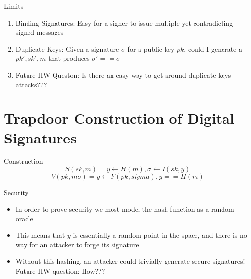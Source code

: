\documentclass[handout]{beamer}
\begin{document}
\begin{frame}{Limits}
    \begin{enumerate}
        \item \pause Binding Signatures: Easy for a signer to issue multiple yet contradicting signed messages
        \item \pause Duplicate Keys: Given a signature \(\sigma\) for a public key \(pk\), could I generate a \(pk', sk', m\) that produces \(\sigma' == \sigma\)
        \item \pause Future HW Queston: Is there an easy way to get around duplicate keys attacks???
    \end{enumerate}
\end{frame}

\section{Trapdoor Construction of Digital Signatures}

\begin{frame}{Construction}
    \pause
    \[S(sk, m) = y \leftarrow H(m), \sigma \leftarrow I(sk, y)\]
    \pause
    \[V(pk, m \sigma) = y \leftarrow F(pk, sigma), y == H(m)\]
\end{frame}

\begin{frame}{Security}
    \begin{itemize}
        \item \pause In order to prove security we most model the hash function as a random oracle
        \item \pause This means that \(y\) is essentially a random point in the space, and there is no way for an attacker to forge its signature
        \item \pause Without this hashing, an attacker could trivially generate secure signatures! Future HW question: How???
    \end{itemize}
\end{frame}
\end{document}
